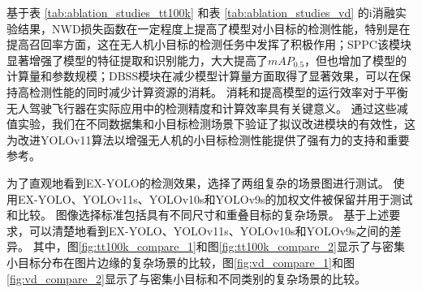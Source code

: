 基于表 \ref{tab:ablation_studies_tt100k} 和表 \ref{tab:ablation_studies_vd} 的i消融实验结果，NWD损失函数在一定程度上提高了模型对小目标的检测性能，特别是在提高召回率方面，这在无人机小目标的检测任务中发挥了积极作用；SPPC该模块显著增强了模型的特征提取和识别能力，大大提高了$mAP_{0.5}$，但也增加了模型的计算量和参数规模；DBSS模块在减少模型计算量方面取得了显著效果，可以在保持高检测性能的同时减少计算资源的消耗。 消耗和提高模型的运行效率对于平衡无人驾驶飞行器在实际应用中的检测精度和计算效率具有关键意义。 通过这些减值实验，我们在不同数据集和小目标检测场景下验证了拟议改进模块的有效性，这为改进YOLOv11算法以增强无人机的小目标检测性能提供了强有力的支持和重要参考。

为了直观地看到EX-YOLO的检测效果，选择了两组复杂的场景图进行测试。 使用EX-YOLO、YOLOv11s、YOLOv10s和YOLOv9s的加权文件被保留并用于测试和比较。 图像选择标准包括具有不同尺寸和重叠目标的复杂场景。 基于上述要求，可以清楚地看到EX-YOLO、YOLOv11s、YOLOv10s和YOLOv9s之间的差异。 其中，图\ref{fig:tt100k_compare_1}和图\ref{fig:tt100k_compare_2}显示了与密集小目标分布在图片边缘的复杂场景的比较，图\ref{fig:vd_compare_1}和图\ref{fig:vd_compare_2}显示了与密集小目标和不同类别的复杂场景的比较。

